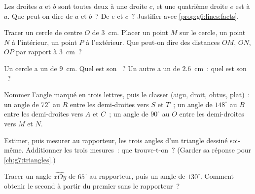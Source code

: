 \begin{exercise}[$\star$]\label{exo:g6:lines:4}
Les droites $a$ et $b$ sont toutes deux  à une droite
$c$, et une quatrième droite $e$ est  à $a$. Que
peut-on dire de $a$ et $b$~? De $e$ et $c$~? Justifier avec
\cref{prop:g6:lines:facts}.
\end{exercise}

\begin{exercise}[$\star$]\label{exo:g6:lines:5}
Tracer un cercle de centre $O$ de  $3$~cm. Placer un point $M$
sur le cercle, un point $N$ à l'intérieur, un point $P$ à
l'extérieur. Que peut-on dire des distances $OM$, $ON$, $OP$ par
rapport à $3$~cm~?
\end{exercise}

\begin{exercise}[$\star$]\label{exo:g6:lines:6}
Un cercle a un  de $9$~cm. Quel est son ~? Un autre a un
 de $2.6$~cm~: quel est son ~?
\end{exercise}

\begin{exercise}[$\star$]\label{exo:g6:lines:7}
Nommer l'angle marqué en trois lettres, puis le classer (aigu, droit,
obtus, plat)~: un angle de $72^\circ$ au  $R$ entre les
demi-droites vers $S$ et $T$~; un angle de $148^\circ$ au  $B$
entre les demi-droites vers $A$ et $C$~; un angle de $90^\circ$ au
 $O$ entre les demi-droites vers $M$ et $N$.
\end{exercise}

\begin{exercise}[$\star$]\label{exo:g6:lines:8}
Estimer, puis mesurer au rapporteur, les trois angles d'un triangle
dessiné soi-même. Additionner les trois mesures~: que trouve-t-on~?
(Garder sa réponse pour \cref{ch:g7:triangles}.)
\end{exercise}

\begin{exercise}[$\star$]\label{exo:g6:lines:9}
Tracer un angle $\widehat{xOy}$ de $65^\circ$ au rapporteur, puis un
angle de $130^\circ$. Comment obtenir le second à partir du premier
sans le rapporteur~?
\end{exercise}

